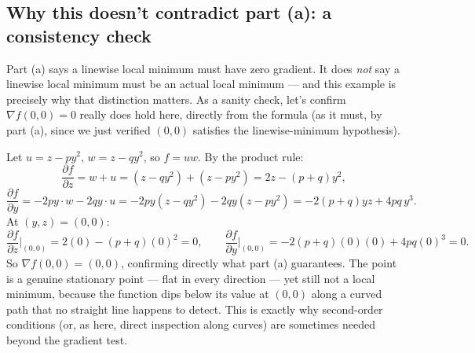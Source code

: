 \documentclass[11pt]{article}
\begin{document}
\subsection*{Why this doesn't contradict part (a): a consistency check}

Part (a) says a linewise local minimum must have zero gradient. It does \emph{not} say a linewise local minimum must be an actual local minimum --- and this example is precisely why that distinction matters. As a sanity check, let's confirm $\nabla f(0,0)=0$ really does hold here, directly from the formula (as it must, by part (a), since we just verified $(0,0)$ satisfies the linewise-minimum hypothesis).

Let $u=z-py^2$, $w=z-qy^2$, so $f=uw$. By the product rule:
\[
\frac{\partial f}{\partial z} = w+u = (z-qy^2)+(z-py^2) = 2z-(p+q)y^2,
\]
\[
\frac{\partial f}{\partial y} = -2py\cdot w - 2qy\cdot u = -2py(z-qy^2) - 2qy(z-py^2) = -2(p+q)yz + 4pq\,y^3.
\]
At $(y,z)=(0,0)$:
\[
\frac{\partial f}{\partial z}\Big|_{(0,0)} = 2(0)-(p+q)(0)^2 = 0, \qquad \frac{\partial f}{\partial y}\Big|_{(0,0)} = -2(p+q)(0)(0)+4pq(0)^3 = 0.
\]
So $\nabla f(0,0)=(0,0)$, confirming directly what part (a) guarantees. The point is a genuine stationary point --- flat in every direction --- yet still not a local minimum, because the function dips below its value at $(0,0)$ along a curved path that no straight line happens to detect. This is exactly why second-order conditions (or, as here, direct inspection along curves) are sometimes needed beyond the gradient test.
\end{document}
